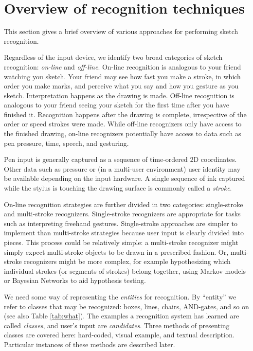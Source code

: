 \section{Overview of recognition techniques}
\label{sec:recognition-techniques}

This section gives a brief overview of various approaches for
performing sketch recognition.

Regardless of the input device, we identify two broad categories of
sketch recognition: \textit{on-line} and \textit{off-line}. On-line
recognition is analogous to your friend watching you sketch. Your
friend may see how fast you make a stroke, in which order you make
marks, and perceive what you say and how you gesture as you
sketch. Interpretation happens as the drawing is made. Off-line
recognition is analogous to your friend seeing your sketch for the first
time after you have finished it. Recognition happens after the drawing
is complete, irrespective of the order or speed strokes were
made. While off-line recognizers only have access to the finished
drawing, on-line recognizers potentially have access to data such as
pen pressure, time, speech, and gesturing.

Pen input is generally captured as a sequence of time-ordered 2D
coordinates. Other data such as pressure or (in a multi-user
environment) user identity may be available depending on the input
hardware. A single sequence of ink captured while the stylus is
touching the drawing surface is commonly called a \textit{stroke}.

On-line recognition strategies are further divided in two categories:
single-stroke and multi-stroke recognizers. Single-stroke recognizers
are appropriate for tasks such as interpreting freehand
gestures. Single-stroke approaches are simpler to implement than
multi-stroke strategies because user input is clearly divided into
pieces. This process could be relatively simple: a multi-stroke
recognizer might simply expect multi-stroke objects to be drawn in a
prescribed fashion. Or, multi-stroke recognizers might be more
complex, for example hypothesizing which individual strokes (or
segments of strokes) belong together, using Markov models or Bayesian
Networks to aid hypothesis testing.

We need some way of representing the \textit{entities} for
recognition. By ``entity'' we refer to classes that may be recognized:
boxes, lines, chairs, AND-gates, and so on (see also Table
\ref{tab:what}). The examples a recognition system has learned are
called \textit{classes}, and user's input are
\textit{candidates}. Three methods of presenting classes are covered
here: hard-coded, visual example, and textual description. Particular
instances of these methods are described later.

